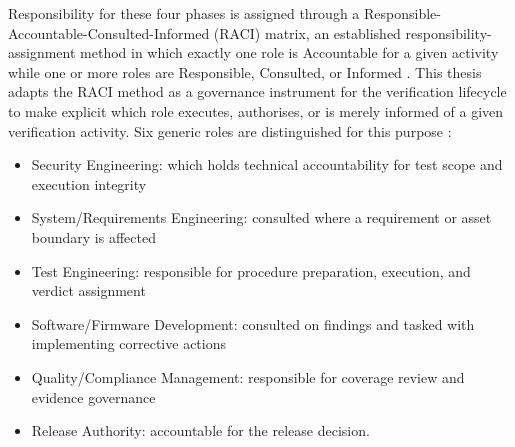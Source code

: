 Responsibility for these four phases is assigned through a Responsible-Accountable-Consulted-Informed (RACI) matrix, an established responsibility-assignment method in which exactly one role is Accountable for a given activity while one or more roles are Responsible, Consulted, or Informed \cite{cybersierra_security_raci_2026}\cite{su13041806}. This thesis adapts the RACI method as a governance instrument for the verification lifecycle to make explicit which role executes, authorises, or is merely informed of a given verification activity. Six generic roles are distinguished for this purpose \Cite[p. 6]{Schmidt2026CybersecurityTestProcess} : 
\begin{itemize}
	\item Security Engineering: which holds technical accountability for test scope and execution integrity
	\item System/Requirements Engineering: consulted where a requirement or asset boundary is affected
	\item Test Engineering: responsible for procedure preparation, execution, and verdict assignment
	\item Software/Firmware Development: consulted on findings and tasked with implementing corrective actions
	\item Quality/Compliance Management: responsible for coverage review and evidence governance
	\item Release Authority: accountable for the release decision.
\end{itemize}


